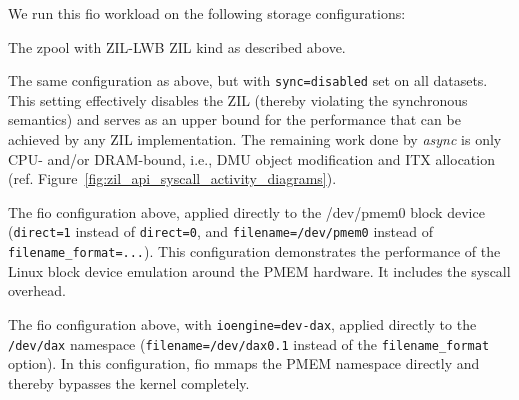 \documentclass[12pt,a4paper,twoside]{book}
\begin{document}
We run this fio workload on the following storage configurations:
\begin{description}[noitemsep,leftmargin=1.5cm,labelindent=1cm]
    \item[zil-lwb] The zpool with ZIL-LWB ZIL kind as described above.
    \item[async] The same configuration as above, but with \lstinline{sync=disabled} set on all datasets.
        This setting effectively disables the ZIL (thereby violating the synchronous semantics) and serves as an upper bound for the performance that can be achieved by any ZIL implementation.
        The remaining work done by \textit{async} is only CPU- and/or DRAM-bound, i.e.,  DMU object modification and ITX allocation (ref. Figure~\ref{fig:zil_api_syscall_activity_diagrams}).
    \item[fsdax] The fio configuration above, applied directly to the /dev/pmem0 block device (\lstinline{direct=1} instead of \lstinline{direct=0}, and \lstinline{filename=/dev/pmem0} instead of \lstinline{filename_format=...}).
        This configuration demonstrates the performance of the Linux block device emulation around the PMEM hardware. It includes the syscall overhead.
    \item[devdax] The fio configuration above, with \lstinline{ioengine=dev-dax}, applied directly to the \texttt{/dev/dax} namespace (\lstinline{filename=/dev/dax0.1} instead of the \lstinline{filename_format} option).
        In this configuration, fio mmaps the PMEM namespace directly and thereby bypasses the kernel completely.
\end{description}

\end{document}
